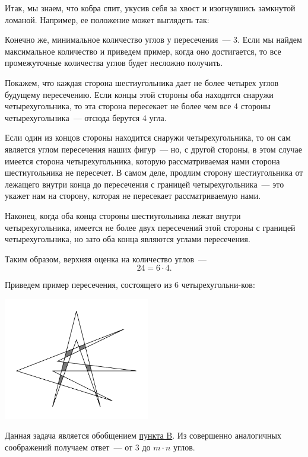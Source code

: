 ﻿

\begin{itemize}
\itA Итак, мы знаем, что кобра спит, укусив себя за хвост и изогнувшись замкнутой ломаной. Например, ее положение может выглядеть так:

\begin{center}  \end{center}

\itB \label{float-ptb} Конечно же, минимальное количество углов у пересечения~— 3. Если мы найдем максимальное количество и приведем пример, когда оно достигается, то все промежуточные количества углов будет несложно получить.

Покажем, что каждая сторона шестиугольника дает не более четырех углов будущему пересечению. Если концы этой стороны оба находятся снаружи четырехугольника, то эта сторона пересекает не более чем все 4 стороны четырехугольника~--- отсюда берутся 4 угла.

Если один из концов стороны находится снаружи четырехугольника, то он сам является углом пересечения наших фигур~--- но, с другой стороны, в этом случае имеется сторона четырехугольника, которую рассматриваемая нами сторона шестиугольника не пересечет. В самом деле, продлим сторону шестиугольника от лежащего внутри конца до пересечения с границей четырехугольника~--- это укажет нам на сторону, которая не пересекает рассматриваемую нами.

Наконец, когда оба конца стороны шестиугольника лежат внутри четырехугольника, имеется не более двух пересечений этой стороны с границей четырехугольника, но зато оба конца являются углами пересечения.

Таким образом, верхняя оценка на количество углов~—
	$$24 = 6 \cdot 4.$$

Приведем пример пересечения, состоящего из 6 четырехугольни-\linebreak ков:

\begin{center}
	\includegraphics[width=6.4cm]{figures/2017-8-3B}
\end{center}

\itC Данная задача является обобщением \hyperref[float-ptb]{пункта B}. Из совершенно аналогичных соображений получаем ответ~--- от 3 до $m \cdot n$ углов.

\end{itemize}
